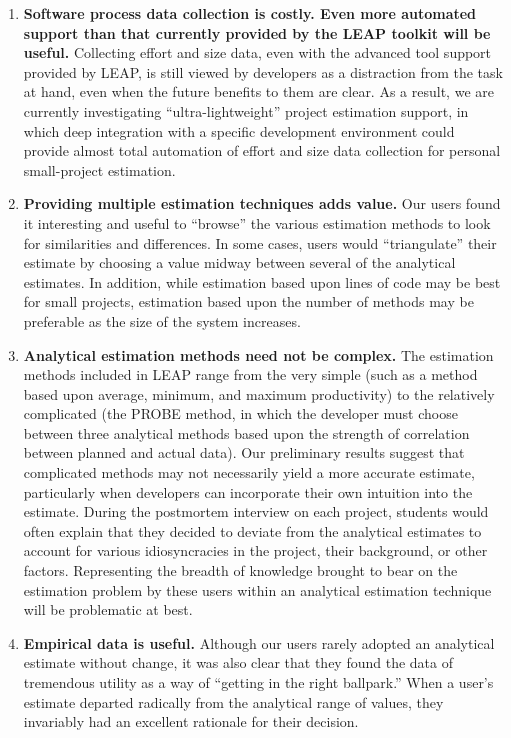 \begin{enumerate}
  
\item {\bf Software process data collection is costly. Even more automated
support than that currently provided by the LEAP toolkit will be useful.}  Collecting effort and size data, even with the advanced
  tool support provided by LEAP, is still viewed by developers as a
  distraction from the task at hand, even when the future benefits to them
  are clear.  As a result, we are currently investigating
  ``ultra-lightweight'' project estimation support, in which deep
  integration with a specific development environment could provide almost
  total automation of effort and size data collection for personal
  small-project estimation. 

\item {\bf Providing multiple estimation techniques adds value.}
  Our users found it interesting and useful to ``browse'' the various
  estimation methods to look for similarities and differences. In some
  cases, users would ``triangulate'' their estimate by choosing a value
  midway between several of the analytical estimates.  In addition, while
  estimation based upon lines of code may be best for small projects,
  estimation based upon the number of methods may be preferable as the size
  of the system increases.
  
\item {\bf Analytical estimation methods need not be complex.}  The
  estimation methods included in LEAP range from the very simple (such as a
  method based upon average, minimum, and maximum productivity) to the
  relatively complicated (the PROBE method, in which the developer must
  choose between three analytical methods based upon the strength of
  correlation between planned and actual data).  Our preliminary results
  suggest that complicated methods may not necessarily yield a more
  accurate estimate, particularly when developers can incorporate their own
  intuition into the estimate.  During the postmortem interview on each
  project, students would often explain that they decided to deviate from the
  analytical estimates to account for various idiosyncracies in the
  project, their background, or other factors.  Representing the breadth of 
  knowledge brought to bear on the estimation problem by these users within 
  an analytical estimation technique will be problematic at best. 
  
\item {\bf Empirical data is useful.} Although our users
  rarely adopted an analytical estimate without change, it was also clear
  that they found the data of tremendous utility as a way of ``getting in
  the right ballpark.''  When a user's estimate departed radically from the
  analytical range of values, they invariably had an excellent rationale
  for their decision.
  

\end{enumerate}
